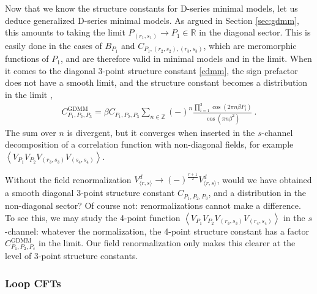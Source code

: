\documentclass[12pt, a4paper]{article}
\theoremstyle{break}
\begin{document}
Now that we know the structure constants for D-series minimal models, let us deduce generalized D-series minimal models. As argued in Section \ref{sec:gdmm}, this amounts to taking the limit $P_{(r_1,s_1)}\to P_1\in\mathbb{R}$ in the diagonal sector. This is easily done in the cases of $B_{P_1}$ and $C_{P_1,(r_2,s_2),(r_3,s_3)}$, which are meromorphic functions of $P_1$, and are therefore valid in minimal models and in the limit. When it comes to the diagonal 3-point structure constant \eqref{cdmm}, the sign prefactor does not have a smooth limit, and the structure constant becomes a distribution in the limit \cite{rib19},
\begin{align}
 \boxed{C^\text{GDMM}_{P_1,P_2,P_3} = \beta C_{P_1,P_2,P_3}\sum_{n\in\mathbb{Z}}(-)^n \frac{\prod_{i=1}^3 \cos(2\pi n\beta P_i)}{\cos(\pi n\beta^2)}}\ .
 \label{cgdmm}
\end{align}
The sum over $n$ is divergent, but it converges when inserted in the $s$-channel decomposition of a correlation function with non-diagonal fields, for example $\left<V_{P_1}V_{P_2}V_{(r_3,s_3)}V_{(s_4,s_4)}\right>$. 

Without the field renormalization $V^d_{\langle r,s\rangle}\to (-)^{\frac{r+1}{2}} V^d_{\langle r,s\rangle}$, would we have obtained a smooth diagonal 3-point structure constant $C_{P_1,P_2,P_3}$, and a distribution in the non-diagonal sector? Of course not: renormalizations cannot make a difference. To see this, we may study the 4-point function $\left<V_{P_1}V_{P_2}V_{(r_3,s_3)}V_{(r_4,s_4)}\right>$ in the $s$-channel: whatever the normalization, the 4-point structure constant has a factor $C^\text{GDMM}_{P_1,P_2,P_s}$ in the limit. Our field renormalization only makes this clearer at the level of 3-point structure constants. 

\subsubsection{Loop CFTs}
\end{document}
